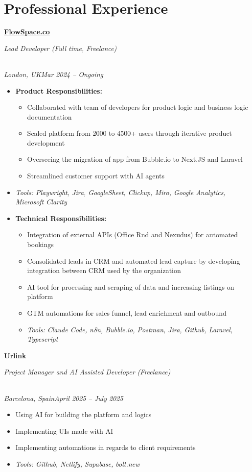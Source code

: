 \documentclass[a4paper,10pt]{article}
\newcommand{\role}[4]{\vspace{3pt}\noindent\hspace{0.6em}\parbox[t]{0.38\textwidth}{\raggedright\textbf{#1}}\hfill\parbox[t]{0.58\textwidth}{\raggedleft\textit{#2}}\\{\textit{#3}\hfill\textit{#4}}\vspace{1pt}}
\begin{document}
\section{Professional Experience}
\role{\href{https://flowspace.co}{FlowSpace.co}}{Lead Developer (Full time, Freelance)}{London, UK}{Mar 2024 -- Ongoing}
\begin{itemize}
\item \textbf{Product Responsibilities:}
\begin{itemize}[label=--]
\item Collaborated with team of developers for product logic and business logic documentation
\item Scaled platform from 2000 to 4500+ users through iterative product development
\item Overseeing the migration of app from Bubble.io to Next.JS and Laravel
\item Streamlined customer support with AI agents
\end{itemize}
\item \textit{Tools: Playwright, Jira, GoogleSheet, Clickup, Miro, Google Analytics, Microsoft Clarity}
\item \textbf{Technical Responsibilities:}
\begin{itemize}[label=--]
\item Integration of external APIs (Office Rnd and Nexudus) for automated bookings
\item Consolidated leads in CRM and automated lead capture by developing integration between CRM used by the organization
\item AI tool for processing and scraping of data and increasing listings on platform
\item GTM automations for sales funnel, lead enrichment and outbound
\item \textit{Tools: Claude Code, n8n, Bubble.io, Postman, Jira, Github, Laravel, Typescript}
\end{itemize}
\end{itemize}

\role{Urlink}{Project Manager and AI Assisted Developer (Freelance)}{Barcelona, Spain}{April 2025 -- July 2025}
\begin{itemize}
\item Using AI for building the platform and logics
\item Implementing UIs made with AI
\item Implementing automations in regards to client requirements
\item \textit{Tools: Github, Netlify, Supabase, bolt.new}
\end{itemize}
\end{document}
